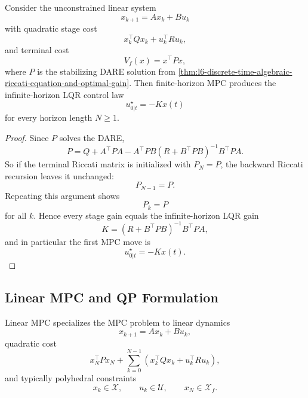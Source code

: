 \begin{algorithm}[H]
	\DontPrintSemicolon
	\caption{Receding-Horizon MPC}
\label{alg:l9-receding-horizon-mpc}
\end{algorithm}

\begin{proposition}\label{prop:l9-mpc-reduces-to-lqr-in-the-unconstrained-linear-quadratic-case}
	Consider the unconstrained linear system
	\[
		x_{k+1}=Ax_k+Bu_k
	\]
	with quadratic stage cost
	\[
		x_k^\top Q x_k + u_k^\top R u_k,
	\]
	and terminal cost
	\[
		V_f(x)=x^\top P x,
	\]
	where $P$ is the stabilizing DARE solution from \autoref{thm:l6-discrete-time-algebraic-riccati-equation-and-optimal-gain}. Then finite-horizon MPC produces the infinite-horizon LQR control law
	\[
		u_{0|t}^\star = -Kx(t)
	\]
	for every horizon length $N \ge 1$.
\end{proposition}
\begin{proof}
	Since $P$ solves the DARE,
	\[
		P = Q + A^\top P A - A^\top P B(R+B^\top P B)^{-1}B^\top P A.
	\]
	So if the terminal Riccati matrix is initialized with $P_N=P$, the backward Riccati recursion leaves it unchanged:
	\[
		P_{N-1}=P.
	\]
	Repeating this argument shows
	\[
		P_k=P
	\]
	for all $k$. Hence every stage gain equals the infinite-horizon LQR gain
	\[
		K=(R+B^\top P B)^{-1}B^\top P A,
	\]
	and in particular the first MPC move is
	\[
		u_{0|t}^\star=-Kx(t).
	\]
\end{proof}

\subsection{Linear MPC and QP Formulation}
\label{sec:l9-linear-mpc-and-qp-formulation}

\begin{definition}\label{def:l9-linear-mpc}
	Linear MPC specializes the MPC problem to linear dynamics
	\[
		x_{k+1}=Ax_k+Bu_k,
	\]
	quadratic cost
	\[
		x_N^\top P x_N + \sum_{k=0}^{N-1}\left(x_k^\top Q x_k + u_k^\top R u_k\right),
	\]
	and typically polyhedral constraints
	\[
		x_k \in \mathcal{X},
		\qquad
		u_k \in \mathcal{U},
		\qquad
		x_N \in \mathcal{X}_f.
	\]
\end{definition}

